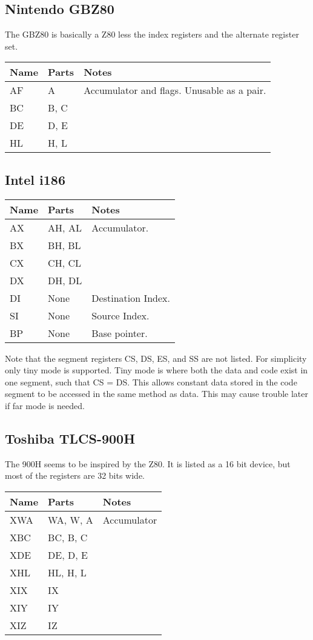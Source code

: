 \documentclass{article}
\newcommand{\tosh}{Toshiba TLCS-900H}
\begin{document}
\subsection{Nintendo GBZ80}
The GBZ80 is basically a Z80 less the index registers and the
alternate register set. \\
\begin{tabular}{l|l|l}
	Name	& Parts	& Notes \\ \hline
	AF	& A	& Accumulator and flags.  Unusable as a pair. \\ \hline
	BC	& B, C	& \\ \hline
	DE	& D, E	& \\ \hline
	HL	& H, L	& \\
\end{tabular}

\subsection{Intel i186}
\begin{tabular}{l|l|l}
	Name	& Parts		& Notes \\ \hline
	AX	& AH, AL	& Accumulator. \\ \hline
	BX	& BH, BL	& \\ \hline
	CX	& CH, CL	& \\ \hline
	DX	& DH, DL	& \\ \hline
	DI	& None		& Destination Index. \\ \hline
	SI	& None		& Source Index. \\ \hline
	BP	& None		& Base pointer. \\
\end{tabular}

Note that the segment registers CS, DS, ES, and SS are not listed.
For simplicity only tiny mode is supported.  Tiny mode is where both
the data and code exist in one segment, such that CS = DS.  This
allows constant data stored in the code segment to be accessed in the
same method as data.  This may cause trouble later if far mode is
needed.

\subsection{\tosh}
The 900H seems to be inspired by the Z80.  It is listed as a 16 bit
device, but most of the registers are 32 bits wide. \\
\begin{tabular}{l|l|l}
	Name	& Parts		& Notes \\ \hline
	XWA	& WA, W, A	& Accumulator \\ \hline
	XBC	& BC, B, C	& \\ \hline
	XDE	& DE, D, E	& \\ \hline
	XHL	& HL, H, L	& \\ \hline
	XIX	& IX		& \\ \hline
	XIY	& IY		& \\ \hline
	XIZ	& IZ		& \\
\end{tabular}
\end{document}
